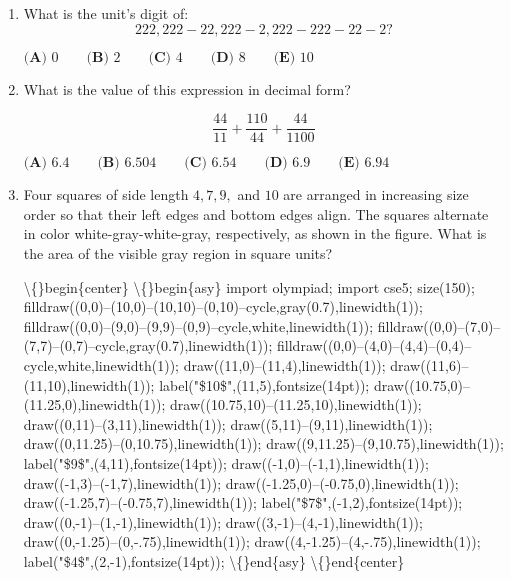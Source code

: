\documentclass{article}
\begin{document}
\begin{enumerate}[label=\arabic*., itemsep=0.5em]\item What is the unit's digit of: 
\begin{equation*}
222{,}222-22{,}222-2{,}222-222-22-2?
\end{equation*}

\(\textbf{(A) } 0\qquad\textbf{(B) } 2\qquad\textbf{(C) } 4\qquad\textbf{(D) } 8\qquad\textbf{(E) } 10\)\par \vspace{0.5em}\item What is the value of this expression in decimal form?

\begin{equation*}
\frac{44}{11} + \frac{110}{44} + \frac{44}{1100}
\end{equation*}

\(\textbf{(A) } 6.4\qquad\textbf{(B) } 6.504\qquad\textbf{(C) } 6.54\qquad\textbf{(D) } 6.9\qquad\textbf{(E) } 6.94\)\par \vspace{0.5em}\item Four squares of side length \(4, 7, 9,\) and \(10\) are arranged in increasing size order so that their left edges and bottom edges align. The squares alternate in color white-gray-white-gray, respectively, as shown in the figure. What is the area of the visible gray region in square units?

\textbackslash\{\}begin\{center\}
\textbackslash\{\}begin\{asy\}
import olympiad;
import cse5;
size(150);
filldraw((0,0)--(10,0)--(10,10)--(0,10)--cycle,gray(0.7),linewidth(1));
filldraw((0,0)--(9,0)--(9,9)--(0,9)--cycle,white,linewidth(1));
filldraw((0,0)--(7,0)--(7,7)--(0,7)--cycle,gray(0.7),linewidth(1));
filldraw((0,0)--(4,0)--(4,4)--(0,4)--cycle,white,linewidth(1));
draw((11,0)--(11,4),linewidth(1));
draw((11,6)--(11,10),linewidth(1));
label("\$10\$",(11,5),fontsize(14pt));
draw((10.75,0)--(11.25,0),linewidth(1));
draw((10.75,10)--(11.25,10),linewidth(1));
draw((0,11)--(3,11),linewidth(1));
draw((5,11)--(9,11),linewidth(1));
draw((0,11.25)--(0,10.75),linewidth(1));
draw((9,11.25)--(9,10.75),linewidth(1));
label("\$9\$",(4,11),fontsize(14pt));
draw((-1,0)--(-1,1),linewidth(1));
draw((-1,3)--(-1,7),linewidth(1));
draw((-1.25,0)--(-0.75,0),linewidth(1));
draw((-1.25,7)--(-0.75,7),linewidth(1));
label("\$7\$",(-1,2),fontsize(14pt));
draw((0,-1)--(1,-1),linewidth(1));
draw((3,-1)--(4,-1),linewidth(1));
draw((0,-1.25)--(0,-.75),linewidth(1));
draw((4,-1.25)--(4,-.75),linewidth(1));
label("\$4\$",(2,-1),fontsize(14pt));
\textbackslash\{\}end\{asy\}
\textbackslash\{\}end\{center\}


\end{enumerate}
\end{document}

